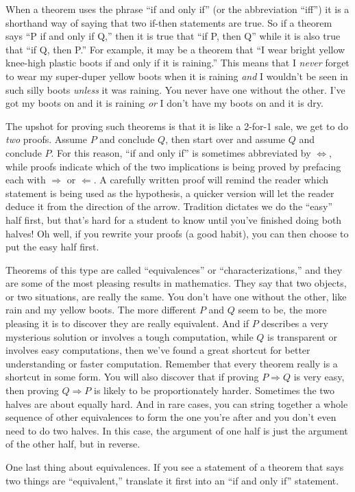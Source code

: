 When a theorem uses the phrase ``if and only if'' (or the abbreviation ``iff'') it is a shorthand way of saying that two if-then statements are true.  So if a theorem says ``P if and only if Q,'' then it is true that ``if P, then Q'' while it is also true that ``if Q, then P.''   For example, it may be a theorem that ``I wear bright yellow knee-high plastic boots if and only if it is raining.''  This means that I {\em never} forget to wear my super-duper yellow boots when it is raining {\em and} I wouldn't be seen in such silly boots {\em unless} it was raining.  You never have one without the other.  I've got my boots on and it is raining {\em or} I don't have my boots on and it is dry.\par
%
The upshot for proving such theorems is that it is like a 2-for-1 sale, we get to do {\em two} proofs.  Assume $P$ and conclude $Q$, then start over and assume $Q$ and conclude $P$.  For this reason, ``if and only if'' is sometimes abbreviated by $\iff$, while proofs indicate which of the two implications is being proved by prefacing each with $\Rightarrow$ or $\Leftarrow$.  A carefully written proof will remind the reader which statement is being used as the hypothesis, a quicker version will let the reader deduce it from the direction of the arrow.  Tradition dictates we do the ``easy'' half first, but that's hard for a student to know until you've finished doing both halves!  Oh well, if you rewrite your proofs (a good habit), you can then choose to put the easy half first.\par
%
Theorems of this type are called ``equivalences'' or ``characterizations,'' and they are some of the most pleasing results in mathematics.  They say that two objects, or two situations, are really the same.  You don't have one without the other, like rain and my yellow boots.  The more different $P$ and $Q$ seem to be, the more pleasing it is to discover they are really equivalent.  And if $P$ describes a very mysterious solution or involves a tough computation, while $Q$ is transparent or involves easy computations, then we've found a great shortcut for better understanding or faster computation.  Remember that every theorem really is a shortcut in some form.  You will also discover that if proving $P\Rightarrow Q$ is very easy, then proving $Q\Rightarrow P$ is likely to be proportionately harder.  Sometimes the two halves are about equally hard.  And in rare cases, you can string together a whole sequence of other equivalences to form the one you're after and you don't even need to do two halves.  In this case, the argument of one half is just the argument of the other half, but in reverse.\par
%
One last thing about equivalences.  If you see a statement of a theorem that says two things are ``equivalent,'' translate it first into an ``if and only if'' statement.
